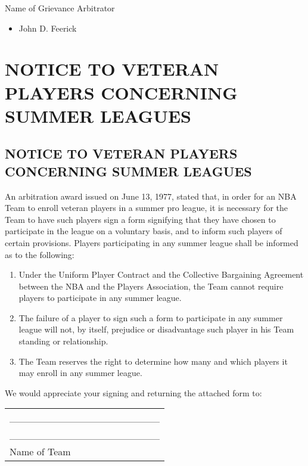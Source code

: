 \documentclass[
]{book}
\providecommand{\tightlist}{%
  \setlength{\itemsep}{0pt}\setlength{\parskip}{0pt}}
\begin{document}
Name of Grievance Arbitrator

\begin{itemize}
\tightlist
\item
  John D. Feerick
\end{itemize}

\hypertarget{notice-to-veteran-players-concerning-summer-leagues}{%
\chapter{NOTICE TO VETERAN PLAYERS CONCERNING SUMMER LEAGUES}\label{notice-to-veteran-players-concerning-summer-leagues}}

\hypertarget{notice-to-veteran-players-concerning-summer-leagues-1}{%
\section{NOTICE TO VETERAN PLAYERS CONCERNING SUMMER LEAGUES}\label{notice-to-veteran-players-concerning-summer-leagues-1}}

An arbitration award issued on June 13, 1977, stated that, in order for an NBA Team to enroll veteran players in a summer pro league, it is necessary for the Team to have such players sign a form signifying that they have chosen to participate in the league on a voluntary basis, and to inform such players of certain provisions. Players participating in any summer league shall be informed as to the following:

\begin{enumerate}
\def\labelenumi{\arabic{enumi}.}
\tightlist
\item
  Under the Uniform Player Contract and the Collective Bargaining Agreement between the NBA and the Players Association, the Team cannot require players to participate in any summer league.
\item
  The failure of a player to sign such a form to participate in any summer league will not, by itself, prejudice or disadvantage such player in his Team standing or relationship.
\item
  The Team reserves the right to determine how many and which players it may enroll in any summer league.
\end{enumerate}

We would appreciate your signing and returning the attached form to:

\begin{longtable}[]{@{}l@{}}
\toprule()
\endhead
\_\_\_\_\_\_\_\_\_\_\_\_\_\_\_\_\_\_\_\_\_ \\
\_\_\_\_\_\_\_\_\_\_\_\_\_\_\_\_\_\_\_\_\_ \\
Name of Team \\
\bottomrule()
\end{longtable}
\end{document}
